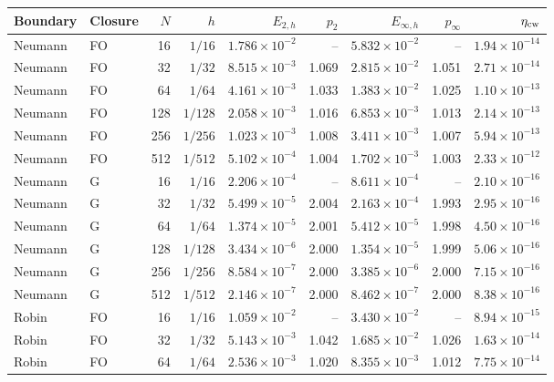 \begin{table}[htbp]
\centering
\scriptsize
\setlength{\tabcolsep}{4pt}
\begin{tabular}{llrrrrrrr}
\toprule
Boundary & Closure & $N$ & $h$ & $E_{2,h}$ & $p_2$ & $E_{\infty,h}$ & $p_\infty$ & $\eta_{\rm cw}$ \\
\midrule
Neumann & FO & 16 & $1/16$ & $1.786\times10^{-2}$ & -- & $5.832\times10^{-2}$ & -- & $1.94\times10^{-14}$ \\
Neumann & FO & 32 & $1/32$ & $8.515\times10^{-3}$ & 1.069 & $2.815\times10^{-2}$ & 1.051 & $2.71\times10^{-14}$ \\
Neumann & FO & 64 & $1/64$ & $4.161\times10^{-3}$ & 1.033 & $1.383\times10^{-2}$ & 1.025 & $1.10\times10^{-13}$ \\
Neumann & FO & 128 & $1/128$ & $2.058\times10^{-3}$ & 1.016 & $6.853\times10^{-3}$ & 1.013 & $2.14\times10^{-13}$ \\
Neumann & FO & 256 & $1/256$ & $1.023\times10^{-3}$ & 1.008 & $3.411\times10^{-3}$ & 1.007 & $5.94\times10^{-13}$ \\
Neumann & FO & 512 & $1/512$ & $5.102\times10^{-4}$ & 1.004 & $1.702\times10^{-3}$ & 1.003 & $2.33\times10^{-12}$ \\
Neumann & G & 16 & $1/16$ & $2.206\times10^{-4}$ & -- & $8.611\times10^{-4}$ & -- & $2.10\times10^{-16}$ \\
Neumann & G & 32 & $1/32$ & $5.499\times10^{-5}$ & 2.004 & $2.163\times10^{-4}$ & 1.993 & $2.95\times10^{-16}$ \\
Neumann & G & 64 & $1/64$ & $1.374\times10^{-5}$ & 2.001 & $5.412\times10^{-5}$ & 1.998 & $4.50\times10^{-16}$ \\
Neumann & G & 128 & $1/128$ & $3.434\times10^{-6}$ & 2.000 & $1.354\times10^{-5}$ & 1.999 & $5.06\times10^{-16}$ \\
Neumann & G & 256 & $1/256$ & $8.584\times10^{-7}$ & 2.000 & $3.385\times10^{-6}$ & 2.000 & $7.15\times10^{-16}$ \\
Neumann & G & 512 & $1/512$ & $2.146\times10^{-7}$ & 2.000 & $8.462\times10^{-7}$ & 2.000 & $8.38\times10^{-16}$ \\
Robin & FO & 16 & $1/16$ & $1.059\times10^{-2}$ & -- & $3.430\times10^{-2}$ & -- & $8.94\times10^{-15}$ \\
Robin & FO & 32 & $1/32$ & $5.143\times10^{-3}$ & 1.042 & $1.685\times10^{-2}$ & 1.026 & $1.63\times10^{-14}$ \\
Robin & FO & 64 & $1/64$ & $2.536\times10^{-3}$ & 1.020 & $8.355\times10^{-3}$ & 1.012 & $7.75\times10^{-14}$ \\

\end{tabular}
\end{table}
